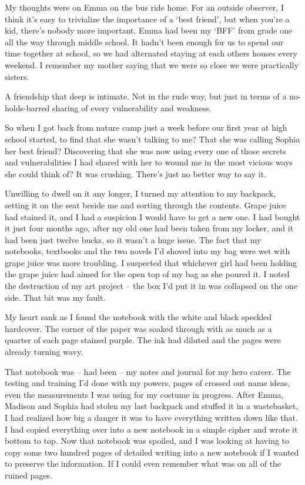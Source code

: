 





My thoughts were on Emma on the bus ride home.  For an outside observer, I think it's easy to trivialize the importance of a `best friend', but when you're a kid, there's nobody more important.  Emma had been my `BFF' from grade one all the way through middle school.  It hadn't been enough for us to spend our time together at school, so we had alternated staying at each others houses every weekend.  I remember my mother saying that we were so close we were practically sisters.



A friendship that deep is intimate.  Not in the rude way, but just in terms of a no-holds-barred sharing of every vulnerability and weakness.



So when I got back from nature camp just a week before our first year at high school started, to find that she wasn't talking to me?  That she was calling Sophia her best friend?  Discovering that she was now using every one of those secrets and vulnerabilities I had shared with her to wound me in the most vicious ways she could think of?  It was crushing.  There's just no better way to say it.



Unwilling to dwell on it any longer, I turned my attention to my backpack, setting it on the seat beside me and sorting through the contents.  Grape juice had stained it, and I had a suspicion I would have to get a new one.  I had bought it just four months ago, after my old one had been taken from my locker, and it had been just twelve bucks, so it wasn't a huge issue.  The fact that my notebooks, textbooks and the two novels I'd shoved into my bag were wet with grape juice was more troubling.  I suspected that whichever girl had been holding the grape juice had aimed for the open top of my bag as she poured it.  I noted the destruction of my art project – the box I'd put it in was collapsed on the one side.  That bit was my fault.



My heart sank as I found the notebook with the white and black speckled hardcover.  The corner of the paper was soaked through with as much as a quarter of each page stained purple.  The ink had diluted and the pages were already turning wavy.



That notebook was – had been – my notes and journal for my hero career.  The testing and training I'd done with my powers, pages of crossed out name ideas, even the measurements I was using for my costume in progress.  After Emma, Madison and Sophia had stolen my last backpack and stuffed it in a wastebasket, I had realized how big a danger it was to have everything written down like that.  I had copied everything over into a new notebook in a simple cipher and wrote it bottom to top.  Now that notebook was spoiled, and I was looking at having to copy some two hundred pages of detailed writing into a new notebook if I wanted to preserve the information.  If I could even remember what was on all of the ruined pages.



